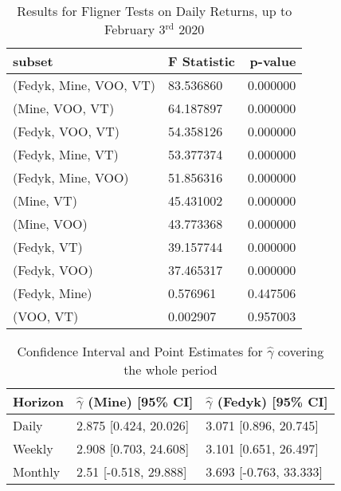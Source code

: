 \begin{appendices}
\begin{table}[ht]
\centering
\caption{Results for Fligner Tests on Daily Returns, up to February 3$^\text{rd}$ 2020}
    \begin{tabular}{lll}
    \toprule
    \textbf{subset}        & \multicolumn{1}{r}{\textbf{F Statistic}} & \multicolumn{1}{r}{\textbf{p-value}} \\ \midrule
    (Fedyk, Mine, VOO, VT)              & 83.536860                      & 0.000000                       \\
    (Mine, VOO, VT)                     & 64.187897                      & 0.000000                       \\
    (Fedyk, VOO, VT)                    & 54.358126                      & 0.000000                       \\
    (Fedyk, Mine, VT)                   & 53.377374                      & 0.000000                       \\
    (Fedyk, Mine, VOO)                  & 51.856316                      & 0.000000                       \\
    (Mine, VT)                          & 45.431002                      & 0.000000                       \\
    (Mine, VOO)                         & 43.773368                      & 0.000000                       \\
    (Fedyk, VT)                         & 39.157744                      & 0.000000                       \\
    (Fedyk, VOO)                        & 37.465317                      & 0.000000                       \\
    (Fedyk, Mine)                       & 0.576961                       & 0.447506                       \\
    (VOO, VT)                           & 0.002907                       & 0.957003                      
    \end{tabular}
\label{tab:fligner_before}
\end{table}

\begin{table}[ht]
\centering
\caption{Confidence Interval and Point Estimates for $\hat\gamma$ covering the whole period}
    \begin{tabular}{lll}
    \toprule
    \textbf{Horizon}        & \multicolumn{1}{r}{$\hat\gamma$ \textbf{(Mine)} [95\% CI]} & \multicolumn{1}{r}{$\hat\gamma$ \textbf{(Fedyk)} [95\% CI]} \\ \midrule
    Daily                      & 2.875 [0.424, 20.026]                      & 3.071 [0.896, 20.745]                       \\
    Weekly                     & 2.908 [0.703, 24.608]                      & 3.101 [0.651, 26.497]                       \\
    Monthly                    & 2.51 [-0.518, 29.888]                      & 3.693 [-0.763, 33.333]                       \\
    \end{tabular}
\label{tab:gamma_all}
\end{table}
    

\end{appendices}
